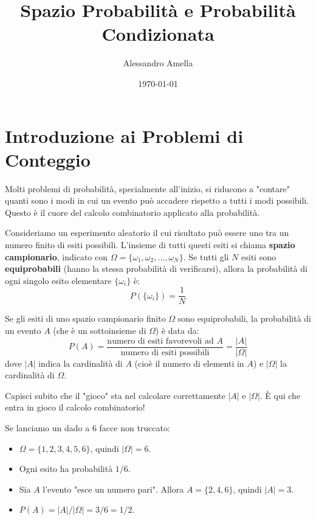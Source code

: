 

\title{Spazio Probabilità e Probabilità Condizionata}
\author{Alessandro Amella}
\date{\today}



\maketitle
\tableofcontents
\newpage

\section{Introduzione ai Problemi di Conteggio}
Molti problemi di probabilità, specialmente all'inizio, si riducono a "contare" quanti sono i modi in cui un evento può accadere rispetto a tutti i modi possibili. Questo è il cuore del calcolo combinatorio applicato alla probabilità.

\begin{definition}
Consideriamo un esperimento aleatorio il cui risultato può essere uno tra un numero finito di esiti possibili. L'insieme di tutti questi esiti si chiama \textbf{spazio campionario}, indicato con $\Omega = \{\omega_1, \omega_2, \dots, \omega_N\}$.
Se tutti gli $N$ esiti sono \textbf{equiprobabili} (hanno la stessa probabilità di verificarsi), allora la probabilità di ogni singolo esito elementare $\{\omega_i\}$ è:
$$ P(\{\omega_i\}) = \frac{1}{N} $$
\end{definition}

\begin{theorem}
Se gli esiti di uno spazio campionario finito $\Omega$ sono equiprobabili, la probabilità di un evento $A$ (che è un sottoinsieme di $\Omega$) è data da:
$$ P(A) = \frac{\text{numero di esiti favorevoli ad } A}{\text{numero di esiti possibili}} = \frac{|A|}{|\Omega|} $$
dove $|A|$ indica la cardinalità di $A$ (cioè il numero di elementi in $A$) e $|\Omega|$ la cardinalità di $\Omega$.
\end{theorem}

\begin{remark}
Capisci subito che il "gioco" sta nel calcolare correttamente $|A|$ e $|\Omega|$. È qui che entra in gioco il calcolo combinatorio!
\end{remark}

\begin{example}
Se lanciamo un dado a 6 facce non truccato:
\begin{itemize}
    \item $\Omega = \{1, 2, 3, 4, 5, 6\}$, quindi $|\Omega|=6$.
    \item Ogni esito ha probabilità $1/6$.
    \item Sia $A$ l'evento "esce un numero pari". Allora $A = \{2, 4, 6\}$, quindi $|A|=3$.
    \item $P(A) = |A|/|\Omega| = 3/6 = 1/2$.
\end{itemize}
\end{example}

